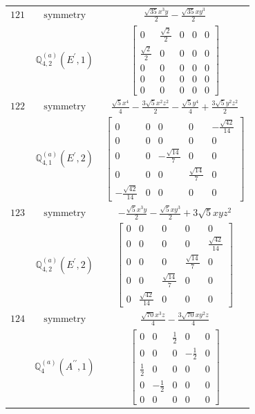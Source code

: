 \documentclass[fleqn,8pt,landscape]{jsarticle}
\begin{document}
\begin{longtable}{ccc}
$ 121 $ & $ \text{symmetry} $ & $ \frac{\sqrt{35} x^{3} y}{2} - \frac{\sqrt{35} x y^{3}}{2} $ \\
$  $ & $ \mathbb{Q}_{4,2}^{(a)}(E^{\prime},1) $ & $ \begin{bmatrix} 0 & \frac{\sqrt{2}}{2} & 0 & 0 & 0 \\ \frac{\sqrt{2}}{2} & 0 & 0 & 0 & 0 \\ 0 & 0 & 0 & 0 & 0 \\ 0 & 0 & 0 & 0 & 0 \\ 0 & 0 & 0 & 0 & 0 \end{bmatrix} $ \\ \hline
$ 122 $ & $ \text{symmetry} $ & $ \frac{\sqrt{5} x^{4}}{4} - \frac{3 \sqrt{5} x^{2} z^{2}}{2} - \frac{\sqrt{5} y^{4}}{4} + \frac{3 \sqrt{5} y^{2} z^{2}}{2} $ \\
$  $ & $ \mathbb{Q}_{4,1}^{(a)}(E^{\prime},2) $ & $ \begin{bmatrix} 0 & 0 & 0 & 0 & - \frac{\sqrt{42}}{14} \\ 0 & 0 & 0 & 0 & 0 \\ 0 & 0 & - \frac{\sqrt{14}}{7} & 0 & 0 \\ 0 & 0 & 0 & \frac{\sqrt{14}}{7} & 0 \\ - \frac{\sqrt{42}}{14} & 0 & 0 & 0 & 0 \end{bmatrix} $ \\ \hline
$ 123 $ & $ \text{symmetry} $ & $ - \frac{\sqrt{5} x^{3} y}{2} - \frac{\sqrt{5} x y^{3}}{2} + 3 \sqrt{5} x y z^{2} $ \\
$  $ & $ \mathbb{Q}_{4,2}^{(a)}(E^{\prime},2) $ & $ \begin{bmatrix} 0 & 0 & 0 & 0 & 0 \\ 0 & 0 & 0 & 0 & \frac{\sqrt{42}}{14} \\ 0 & 0 & 0 & \frac{\sqrt{14}}{7} & 0 \\ 0 & 0 & \frac{\sqrt{14}}{7} & 0 & 0 \\ 0 & \frac{\sqrt{42}}{14} & 0 & 0 & 0 \end{bmatrix} $ \\ \hline
$ 124 $ & $ \text{symmetry} $ & $ \frac{\sqrt{70} x^{3} z}{4} - \frac{3 \sqrt{70} x y^{2} z}{4} $ \\
$  $ & $ \mathbb{Q}_{4}^{(a)}(A^{\prime\prime},1) $ & $ \begin{bmatrix} 0 & 0 & \frac{1}{2} & 0 & 0 \\ 0 & 0 & 0 & - \frac{1}{2} & 0 \\ \frac{1}{2} & 0 & 0 & 0 & 0 \\ 0 & - \frac{1}{2} & 0 & 0 & 0 \\ 0 & 0 & 0 & 0 & 0 \end{bmatrix} $ \\ \hline

\end{longtable}
\end{document}
